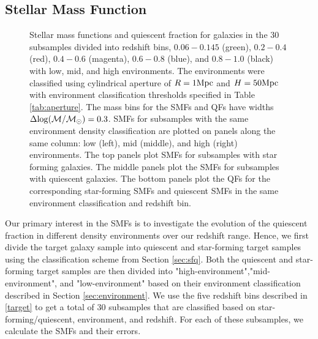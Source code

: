 \documentclass{emulateapj}
\begin{document}
\subsection{Stellar Mass Function} \label{sec:smf_const}
\begin{figure*}
    \begin{center}
        \leavevmode
        \label{fig:smf}
        \caption{Stellar mass functions and quiescent fraction for galaxies in the $30$ subsamples divided into redshift bins, $0.06-0.145$ (green), $0.2-0.4$ (red), $0.4-0.6$ 
(magenta), $0.6-0.8$ (blue), and $0.8-1.0$ (black) with low, mid, and high environments. The environments were classified using cylindrical aperture of $R=1\rm{Mpc}$ and $H=50\rm{Mpc}$ 
with environment classification thresholds specified in Table \ref{tab:aperture}. The mass bins for the SMFs and QFs have widths $\Delta \rm{log}(\mathcal{M}/\mathcal{M}_{\odot})=0.3$. 
SMFs for subsamples with the same environment density classification are plotted on panels along the same column: low (left), mid (middle), and high (right) environments. The top
panels plot SMFs for subsamples with star forming galaxies. The middle panels plot the SMFs for subsamples with quiescent galaxies. The bottom panels plot the QFs for the 
corresponding star-forming SMFs and quiescent SMFs in the same environment classification and redshift bin.}
    \end{center}
\end{figure*}
Our primary interest in the SMFs is to investigate the evolution of the quiescent fraction in different density environments over our redshift range. 
Hence, we first divide the target galaxy sample into quiescent and star-forming target samples using the classification scheme from Section \ref{sec:sfq}.
Both the quiescent and star-forming target samples are then divided into "high-environment","mid-environment", and "low-environment" based on their environment classification described in 
Section \ref{sec:environment}.
We use the five redshift bins described in \ref{target} to get a total of $30$ subsamples that are classified based on star-forming/quiescent, environment, and redshift.
For each of these subsamples, we calculate the SMFs and their errors. 
\end{document}
